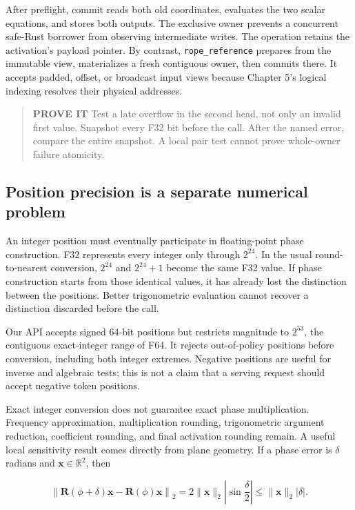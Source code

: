 \documentclass[
  10pt,
]{article}
\begin{document}
After preflight, commit reads both old coordinates, evaluates the two
scalar equations, and stores both outputs. The exclusive owner prevents
a concurrent safe-Rust borrower from observing intermediate writes. The
operation retains the activation's payload pointer. By contrast,
\texttt{rope\_reference} prepares from the immutable view, materializes
a fresh contiguous owner, then commits there. It accepts padded, offset,
or broadcast input views because Chapter 5's logical indexing resolves
their physical addresses.

\begin{quote}
\textbf{PROVE IT} Test a late overflow in the second head, not only an
invalid first value. Snapshot every F32 bit before the call. After the
named error, compare the entire snapshot. A local pair test cannot prove
whole-owner failure atomicity.
\end{quote}

\subsection{Position precision is a separate numerical
problem}\label{position-precision-is-a-separate-numerical-problem}

An integer position must eventually participate in floating-point phase
construction. F32 represents every integer only through \(2^{24}\). In
the usual round-to-nearest conversion, \(2^{24}\) and \(2^{24}+1\)
become the same F32 value. If phase construction starts from those
identical values, it has already lost the distinction between the
positions. Better trigonometric evaluation cannot recover a distinction
discarded before the call.

Our API accepts signed 64-bit positions but restricts magnitude to
\(2^{53}\), the contiguous exact-integer range of F64. It rejects
out-of-policy positions before conversion, including both integer
extremes. Negative positions are useful for inverse and algebraic tests;
this is not a claim that a serving request should accept negative token
positions.

Exact integer conversion does not guarantee exact phase multiplication.
Frequency approximation, multiplication rounding, trigonometric argument
reduction, coefficient rounding, and final activation rounding remain. A
useful local sensitivity result comes directly from plane geometry. If a
phase error is \(\delta\) radians and \(\mathbf{x}\in\mathbb{R}^2\),
then

\[
\left\|\mathbf{R}(\phi+\delta)\mathbf{x}
      -\mathbf{R}(\phi)\mathbf{x}\right\|_2
=2\|\mathbf{x}\|_2\left|\sin\frac{\delta}{2}\right|
\le\|\mathbf{x}\|_2|\delta|.
\]
\end{document}
